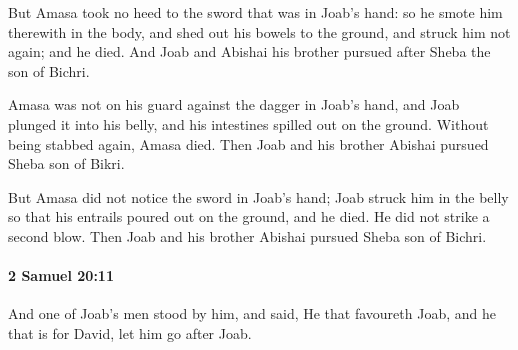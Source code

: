 			\begin{versebox}
					\item[BHS] 
					\item[ASV] But Amasa took no heed to the sword that was in Joab's hand: so he smote him therewith in the body, and shed out his bowels to the ground, and struck him not again; and he died. And Joab and Abishai his brother pursued after Sheba the son of Bichri.
					\item[NIV] Amasa was not on his guard against the dagger in Joab’s hand, and Joab plunged it into his belly, and his intestines spilled out on the ground. Without being stabbed again, Amasa died. Then Joab and his brother Abishai pursued Sheba son of Bikri.
					\item[NRSV] But Amasa did not notice the sword in Joab’s hand; Joab struck him in the belly so that his entrails poured out on the ground, and he died. He did not strike a second blow. Then Joab and his brother Abishai pursued Sheba son of Bichri.
			\end{versebox}

		\paragraph{2 Samuel 20:11} %
			\label{2SAMUEL-20-11}

			And one of Joab’s men stood by him, and said, He that favoureth Joab, and he that is for David, let him go after Joab.

